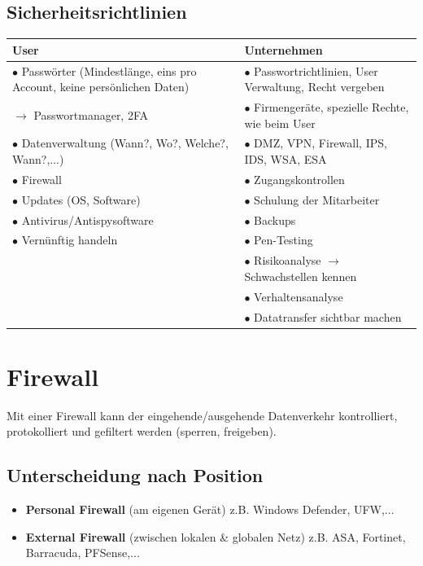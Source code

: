 \subsection*{Sicherheitsrichtlinien}
\begin{tabular}{ | p{} | p{} |} \hline
	\textbf{User} & \textbf{Unternehmen} \\ \hline
	$\bullet$ Passwörter (Mindestlänge, eins pro Account, keine persönlichen Daten) & $\bullet$ Passwortrichtlinien, User Verwaltung, Recht vergeben \\
	$\rightarrow$ Passwortmanager, 2FA & $\bullet$ Firmengeräte, spezielle Rechte, wie beim User \\
	$\bullet$ Datenverwaltung (Wann?, Wo?, Welche?, Wann?,...) & $\bullet$ DMZ, VPN, Firewall, IPS, IDS, WSA, ESA \\
	$\bullet$ Firewall & $\bullet$ Zugangskontrollen \\
	$\bullet$ Updates (OS, Software) & $\bullet$ Schulung der Mitarbeiter \\
	$\bullet$ Antivirus/Antispysoftware & $\bullet$ Backups \\
	$\bullet$ Vernünftig handeln & $\bullet$ Pen-Testing \\
	 & $\bullet$ Risikoanalyse $\rightarrow$ Schwachstellen kennen \\
	 & $\bullet$ Verhaltensanalyse \\
	 & $\bullet$ Datatransfer sichtbar machen \\
	\hline
\end{tabular} 

\section{Firewall}
Mit einer Firewall kann der eingehende/ausgehende Datenverkehr kontrolliert, protokolliert und gefiltert werden (sperren, freigeben).

\subsection*{Unterscheidung nach Position}
\begin{itemize}
	\item \textbf{Personal Firewall} (am eigenen Gerät) z.B. Windows Defender, UFW,...
	\item \textbf{External Firewall} (zwischen lokalen \& globalen Netz) z.B. ASA, Fortinet, Barracuda, PFSense,...
\end{itemize}

